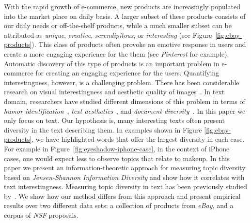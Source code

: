 \documentclass{article} %
\begin{document}
With the rapid growth of e-commerce, new products are increasingly populated into the market place on daily basis.  A larger subset of these products consists of our daily needs or off-the-shelf products, while a much smaller subset can be attributed as {\em unique}, {\em creative}, {\em serendipitous}, or {\em interesting} (see Figure~\ref{fig:ebay-products}). This class of products often provoke an emotive response in users and create a more engaging experience for the them (see  {\em Pinterest} for example). Automatic discovery of this type of products is an important problem in e-commerce for creating an engaging experience for the users.   Quantifying interestingness, however,  is a challenging problem. There has been considerable research on visual interestingness and aesthetic quality of images~\cite{Datta:2006:SAP:2129560.2129588,Ke:2006:DHF:1153170.1153495,IsolaParikhTorralbaOliva2011,dhar:2011,reinecke2013predicting,journals/pami/WeinshallZHKOABGNPHP12}. 
In text domain, researchers have studied different dimensions of this
problem in terms of {\em humor
  identification}~\cite{Mihalcea:2005:MCL:1220575.1220642,Davidov:2010:SRS:1870568.1870582,Kiddon11,labutov-lipson:2012:ACL2012short},
{\em text
  aesthetics}~\cite{journals:tamd:Schmidhuber10,N13-1118,ganguly:2014},
and {\em document diversity}~\cite{bache:2013}.  In this paper we only
focus on text. Our hypothesis is, many interesting texts often
present diversity in the text describing them. In examples shown in Figure \ref{fig:ebay-products}, we have highlighted words that offer the largest diversity in each case.
For example in Figure~\ref{fig:eyeshadow-iphone-case}, in the context of iPhone cases, one would expect less to observe topics that relate to makeup. In this paper we present an information-theoretic approach for measuring topic diversity based on {\em Jensen-Shannon Information Diversity} and show how it correlates with text interestingness. Measuring topic diversity in text has been previously studied by~\cite{bache:2013}. We show how our method differs from this approach and present empirical results over two different data sets: a collection of products from {\sl eBay}, and a corpus of {\sl NSF} proposals. 
\end{document}

